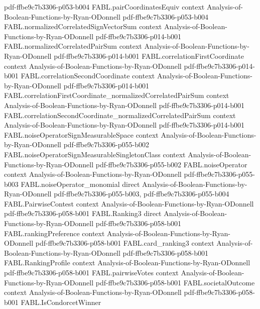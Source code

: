 \begin{theorem}
  {pdf-ffbe9c7b3306-p053-b004}
\proofstep
  {FABL.pairCoordinatesEquiv}
  {context}
  {Analysis-of-Boolean-Functions-by-Ryan-ODonnell}
  {pdf-ffbe9c7b3306-p053-b004}
\proofstep
  {FABL.normalizedCorrelatedSignVectorSum}
  {context}
  {Analysis-of-Boolean-Functions-by-Ryan-ODonnell}
  {pdf-ffbe9c7b3306-p014-b001}
\proofstep
  {FABL.normalizedCorrelatedPairSum}
  {context}
  {Analysis-of-Boolean-Functions-by-Ryan-ODonnell}
  {pdf-ffbe9c7b3306-p014-b001}
\proofstep
  {FABL.correlationFirstCoordinate}
  {context}
  {Analysis-of-Boolean-Functions-by-Ryan-ODonnell}
  {pdf-ffbe9c7b3306-p014-b001}
\proofstep
  {FABL.correlationSecondCoordinate}
  {context}
  {Analysis-of-Boolean-Functions-by-Ryan-ODonnell}
  {pdf-ffbe9c7b3306-p014-b001}
\proofstep
  {FABL.correlationFirstCoordinate_normalizedCorrelatedPairSum}
  {context}
  {Analysis-of-Boolean-Functions-by-Ryan-ODonnell}
  {pdf-ffbe9c7b3306-p014-b001}
\proofstep
  {FABL.correlationSecondCoordinate_normalizedCorrelatedPairSum}
  {context}
  {Analysis-of-Boolean-Functions-by-Ryan-ODonnell}
  {pdf-ffbe9c7b3306-p014-b001}
\proofstep
  {FABL.noiseOperatorSignMeasurableSpace}
  {context}
  {Analysis-of-Boolean-Functions-by-Ryan-ODonnell}
  {pdf-ffbe9c7b3306-p055-b002}
\proofstep
  {FABL.noiseOperatorSignMeasurableSingletonClass}
  {context}
  {Analysis-of-Boolean-Functions-by-Ryan-ODonnell}
  {pdf-ffbe9c7b3306-p055-b002}
\proofstep
  {FABL.noiseOperator}
  {context}
  {Analysis-of-Boolean-Functions-by-Ryan-ODonnell}
  {pdf-ffbe9c7b3306-p055-b003}
\proofstep
  {FABL.noiseOperator_monomial}
  {direct}
  {Analysis-of-Boolean-Functions-by-Ryan-ODonnell}
  {pdf-ffbe9c7b3306-p055-b003,
    pdf-ffbe9c7b3306-p055-b004}
\proofstep
  {FABL.PairwiseContest}
  {context}
  {Analysis-of-Boolean-Functions-by-Ryan-ODonnell}
  {pdf-ffbe9c7b3306-p058-b001}
\proofstep
  {FABL.Ranking3}
  {direct}
  {Analysis-of-Boolean-Functions-by-Ryan-ODonnell}
  {pdf-ffbe9c7b3306-p058-b001}
\proofstep
  {FABL.rankingPreference}
  {context}
  {Analysis-of-Boolean-Functions-by-Ryan-ODonnell}
  {pdf-ffbe9c7b3306-p058-b001}
\proofstep
  {FABL.card_ranking3}
  {context}
  {Analysis-of-Boolean-Functions-by-Ryan-ODonnell}
  {pdf-ffbe9c7b3306-p058-b001}
\proofstep
  {FABL.RankingProfile}
  {context}
  {Analysis-of-Boolean-Functions-by-Ryan-ODonnell}
  {pdf-ffbe9c7b3306-p058-b001}
\proofstep
  {FABL.pairwiseVotes}
  {context}
  {Analysis-of-Boolean-Functions-by-Ryan-ODonnell}
  {pdf-ffbe9c7b3306-p058-b001}
\proofstep
  {FABL.societalOutcome}
  {context}
  {Analysis-of-Boolean-Functions-by-Ryan-ODonnell}
  {pdf-ffbe9c7b3306-p058-b001}
\proofstep
  {FABL.IsCondorcetWinner}

\end{theorem}
